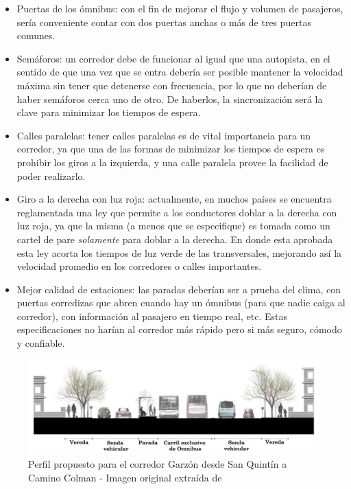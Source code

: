 \begin{itemize}
	\item Puertas de los ómnibus: con el fin de mejorar el flujo y volumen de pasajeros, sería conveniente contar con dos puertas anchas o más de tres puertas comunes.
	\item Semáforos: un corredor debe de funcionar al igual que una autopista, en el sentido de que una vez que se entra debería ser posible mantener la velocidad máxima sin tener que detenerse con frecuencia, por lo que no deberían de haber semáforos cerca uno de otro. De haberlos, la sincronización será la clave para minimizar los tiempos de espera.
	\item Calles paralelas: tener calles paralelas es de vital importancia para un corredor, ya que una de las formas de minimizar los tiempos de espera es prohibir los giros a la izquierda, y una calle paralela provee la facilidad de poder realizarlo.
	\item Giro a la derecha con luz roja: actualmente, en muchos países se encuentra reglamentada una ley que permite a los conductores doblar a la derecha con luz roja, ya que la misma (a menos que se especifique) es tomada como un cartel de pare \emph{solamente} para doblar a la derecha. En donde esta aprobada esta ley acorta los tiempos de luz verde de las transversales, mejorando así la velocidad promedio en los corredores o calles importantes.
	\item Mejor calidad de estaciones: las paradas deberían ser a prueba del clima, con puertas corredizas que abren cuando hay un ómnibus (para que nadie caiga al corredor), con información al pasajero en tiempo real, etc. Estas especificaciones no harían al corredor más rápido pero si más seguro, cómodo y confiable.
\end{itemize}


\begin{figure}[H]
	\centering
	\includegraphics[width=0.9\linewidth]{Figures/busway_configuration}
	\caption[Perfil propuesto para el corredor Garzón.]{Perfil propuesto para el corredor Garzón desde San Quintín a Camino Colman - Imagen original extraída de \citep{PlanMovilidad}
	}
	\label{fig:perfil_garzon}
\end{figure}

